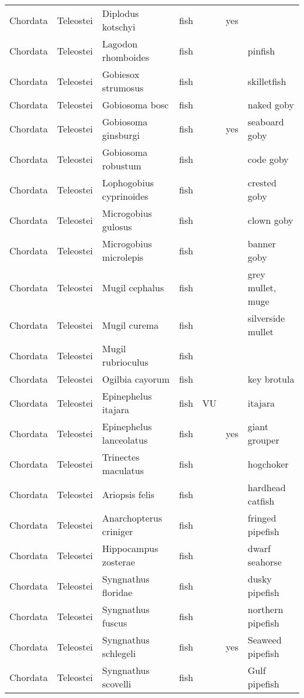 \begin{longtable}{lllllll}
  Chordata & Teleostei & Diplodus kotschyi & fish &  & yes &  \\ 
  Chordata & Teleostei & Lagodon rhomboides & fish &  &  & pinfish \\ 
  Chordata & Teleostei & Gobiesox strumosus & fish &  &  & skilletfish \\ 
  Chordata & Teleostei & Gobiosoma bosc & fish &  &  & naked goby \\ 
  Chordata & Teleostei & Gobiosoma ginsburgi & fish &  & yes & seaboard goby \\ 
  Chordata & Teleostei & Gobiosoma robustum & fish &  &  & code goby \\ 
  Chordata & Teleostei & Lophogobius cyprinoides & fish &  &  & crested goby \\ 
  Chordata & Teleostei & Microgobius gulosus & fish &  &  & clown goby \\ 
  Chordata & Teleostei & Microgobius microlepis & fish &  &  & banner goby \\ 
  Chordata & Teleostei & Mugil cephalus & fish &  &  & grey mullet, muge \\ 
  Chordata & Teleostei & Mugil curema & fish &  &  & silverside mullet \\ 
  Chordata & Teleostei & Mugil rubrioculus & fish &  &  &  \\ 
  Chordata & Teleostei & Ogilbia cayorum & fish &  &  & key brotula \\ 
  Chordata & Teleostei & Epinephelus itajara & fish & VU &  & itajara \\ 
  Chordata & Teleostei & Epinephelus lanceolatus & fish &  & yes & giant grouper \\ 
  Chordata & Teleostei & Trinectes maculatus & fish &  &  & hogchoker \\ 
  Chordata & Teleostei & Ariopsis felis & fish &  &  & hardhead catfish \\ 
  Chordata & Teleostei & Anarchopterus criniger & fish &  &  & fringed pipefish \\ 
  Chordata & Teleostei & Hippocampus zosterae & fish &  &  & dwarf seahorse \\ 
  Chordata & Teleostei & Syngnathus floridae & fish &  &  & dusky pipefish \\ 
  Chordata & Teleostei & Syngnathus fuscus & fish &  &  & northern pipefish \\ 
  Chordata & Teleostei & Syngnathus schlegeli & fish &  & yes & Seaweed pipefish \\ 
  Chordata & Teleostei & Syngnathus scovelli & fish &  &  & Gulf pipefish \\ 

\end{longtable}

